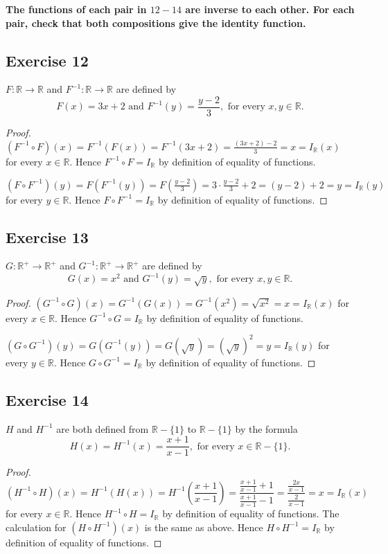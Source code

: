 \documentclass[14pt]{extarticle}
\newcommand{\R}{\mathbb{R}}
\newcommand{\cy}{\color{cyan}}
\begin{document}
{\bf \cy The functions of each pair in $12-14$ are inverse to each other. For each pair, check that both compositions
give the identity function.}

\subsection{Exercise 12}
\(F: \R \to \R\) and \(F^{-1}: \R \to \R\) are defined by
\[
    F(x) = 3x+2 \text{ and } F^{-1}(y) = \frac{y-2}{3}, \text{ for every } x, y \in \R.
\]
\begin{proof}
    \((F^{-1} \circ F)(x) = F^{-1}(F(x)) = F^{-1}(3x+2) = \frac{(3x+2)-2}{3} = x = I_{\R}(x)\) for every \(x \in\R\).
    Hence \(F^{-1} \circ F = I_{\R}\) by definition of equality of functions.

    \((F \circ F^{-1})(y) = F(F^{-1}(y)) = F(\frac{y-2}{3}) = 3 \cdot \frac{y-2}{3} + 2 = (y-2) + 2 = y = I_{\R}(y)\) for
    every \(y \in\R\). Hence \(F \circ F^{-1} = I_{\R}\) by definition of equality of functions.
\end{proof}

\subsection{Exercise 13}
\(G: \R^+ \to \R^+\) and \(G^{-1}: \R^+ \to \R^+\) are defined by
\[
    G(x) = x^2 \text{ and } G^{-1}(y) = \sqrt{y}, \text{ for every } x, y \in \R.
\]
\begin{proof}
    \((G^{-1} \circ G)(x) = G^{-1}(G(x)) = G^{-1}(x^2) = \sqrt{x^2} = x = I_{\R}(x)\) for every \(x \in \R\).
    Hence \(G^{-1} \circ G = I_{\R}\) by definition of equality of functions.

    \((G \circ G^{-1})(y) = G(G^{-1}(y)) = G(\sqrt{y}) = (\sqrt{y})^2 = y = I_{\R}(y)\) for every \(y \in \R\).
    Hence \(G \circ G^{-1} = I_{\R}\) by definition of equality of functions.
\end{proof}

\subsection{Exercise 14}
$H$ and $H^{-1}$ are both defined from $\R - \{1\}$ to $\R - \{1\}$ by the formula
\[
    H(x) = H^{-1}(x) = \frac{x+1}{x-1}, \text{ for every } x \in \R - \{1\}.
\]
\begin{proof}
    \[
        (H^{-1} \circ H)(x) = H^{-1}(H(x)) = H^{-1}\left(\frac{x+1}{x-1}\right)=\frac{\frac{x+1}{x-1}+1}{\frac{x+1}{x-1}-1} =
        \frac{\frac{2x}{x-1}}{\frac{2}{x-1}} = x = I_{\R}(x)
    \]
    for every \(x \in \R\). Hence \(H^{-1} \circ H = I_{\R}\) by definition of equality of functions. The calculation for
    \((H \circ H^{-1})(x)\) is the same as above. Hence \(H \circ H^{-1} = I_{\R}\) by definition of equality of functions.
\end{proof}
\end{document}
